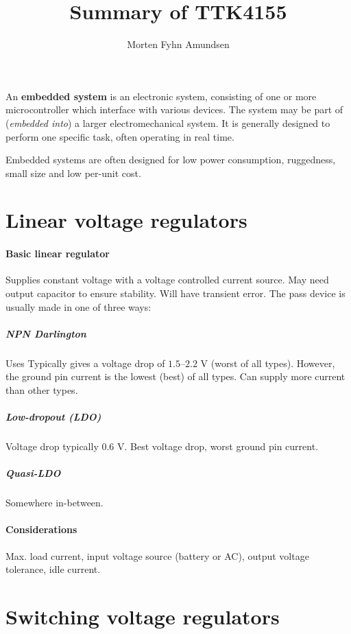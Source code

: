 \documentclass[a4paper, 12pt]{article}
\title{Summary of TTK4155}
\author{Morten Fyhn Amundsen}
\affil{NTNU}
\begin{document}
\maketitle


An \textbf{embedded system} is an electronic system, consisting of one or more microcontroller which interface with various devices. The system may be part of (\emph{embedded into}) a larger electromechanical system. It is generally designed to perform one specific task, often operating in real time.

Embedded systems are often designed for low power consumption, ruggedness, small size and low per-unit cost.


\section{Linear voltage regulators}
\paragraph{Basic linear regulator} Supplies constant voltage with a voltage controlled current source. May need output capacitor to ensure stability. Will have transient error. The pass device is usually made in one of three ways:

\subparagraph{NPN Darlington} Uses Typically gives a voltage drop of $1.5$--$2.2$ V (worst of all types). However, the ground pin current is the lowest (best) of all types. Can supply more current than other types.

\subparagraph{Low-dropout (LDO)} Voltage drop typically $0.6$ V. Best voltage drop, worst ground pin current.

\subparagraph{Quasi-LDO} Somewhere in-between.

\paragraph{Considerations} Max. load current, input voltage source (battery or AC), output voltage tolerance, idle current.



\section{Switching voltage regulators}
\end{document}
